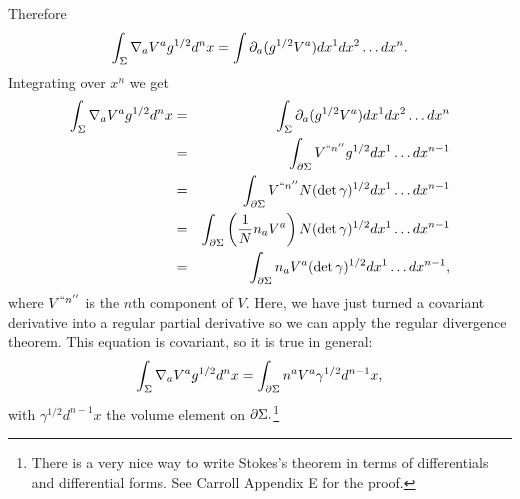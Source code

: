 Therefore
$$\int_\Sigma \nabla_a V^a g^{1/2} d^n x=\int \partial_a(g^{1/2} V^a) dx^1 dx^2 \ldots dx^n.$$
Integrating over $x^n$ we get
\begin{eqnarray*}
\int_\Sigma \nabla_a V^a g^{1/2} d^n x&=&\int_\Sigma \partial_a(g^{1/2} V^a) dx^1 dx^2 \ldots dx^n\\
&=& \int_{\partial \Sigma} V^{``n''} g^{1/2} dx^1 \ldots dx^{n-1}\\
&=& \int_{\partial\Sigma} V^{``n''}N(\det \gamma)^{1/2} dx^1 \ldots dx^{n-1}\\
&=& \int_{\partial\Sigma} \left(\frac{1}{N} n_a V^a\right) N(\det \gamma)^{1/2} dx^1 \ldots dx^{n-1}\\
&=& \int_{\partial\Sigma} n_a V^a (\det \gamma)^{1/2} dx^1 \ldots dx^{n-1},
\end{eqnarray*}
where $V^{``n''}$ is the $n$th component of $V$.
Here, we have just turned a covariant derivative into a regular partial derivative so we can apply the regular divergence theorem.
This equation is covariant, so it is true in general:
$$\int_\Sigma \nabla_a V^a g^{1/2} d^n x = \int_{\partial \Sigma} n^a V^a \gamma^{1/2} d^{n-1}x,$$ with $\gamma^{1/2}d^{n-1}x$ the volume element on $\partial \Sigma.$\footnote{There is a very nice way to write Stokes's theorem in terms of differentials and differential forms. See Carroll Appendix E for the proof.}